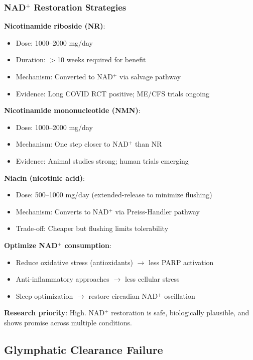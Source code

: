\subsubsection{NAD$^+$ Restoration Strategies}

\textbf{Nicotinamide riboside (NR)}:
\begin{itemize}
    \item Dose: 1000--2000 mg/day
    \item Duration: $>$10 weeks required for benefit
    \item Mechanism: Converted to NAD$^+$ via salvage pathway
    \item Evidence: Long COVID RCT positive; ME/CFS trials ongoing
\end{itemize}

\textbf{Nicotinamide mononucleotide (NMN)}:
\begin{itemize}
    \item Dose: 1000--2000 mg/day
    \item Mechanism: One step closer to NAD$^+$ than NR
    \item Evidence: Animal studies strong; human trials emerging
\end{itemize}

\textbf{Niacin (nicotinic acid)}:
\begin{itemize}
    \item Dose: 500--1000 mg/day (extended-release to minimize flushing)
    \item Mechanism: Converts to NAD$^+$ via Preiss-Handler pathway
    \item Trade-off: Cheaper but flushing limits tolerability
\end{itemize}

\textbf{Optimize NAD$^+$ consumption}:
\begin{itemize}
    \item Reduce oxidative stress (antioxidants) $\rightarrow$ less PARP activation
    \item Anti-inflammatory approaches $\rightarrow$ less cellular stress
    \item Sleep optimization $\rightarrow$ restore circadian NAD$^+$ oscillation
\end{itemize}

\textbf{Research priority}: High. NAD$^+$ restoration is safe, biologically plausible, and shows promise across multiple conditions.

\subsection{Glymphatic Clearance Failure}
\label{sec:glymphatic-translational}

